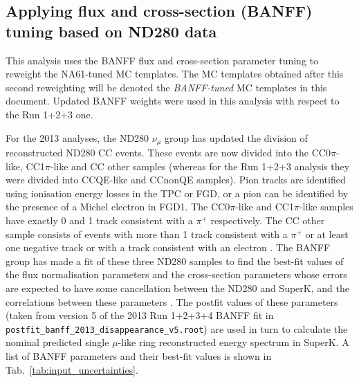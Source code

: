
\subsection {Applying flux and cross-section (BANFF) tuning based on ND280 data}
\label{sec:banff_weights}

This analysis uses the BANFF flux and cross-section parameter tuning to reweight the NA61-tuned MC templates.
The MC templates obtained after this second reweighting will be denoted the {\em BANFF-tuned} MC templates
in this document.
Updated BANFF weights were used in this analysis with respect to the Run 1+2+3 one.

For the 2013 analyses, the ND280 $\nu_{\mu}$ group has updated the division of reconstructed ND280 CC events. 
These events are now divided into the CC0$\pi$-like, CC1$\pi$-like and CC other samples (whereas for the Run 1+2+3 analysis they were divided into CCQE-like 
and CCnonQE samples). Pion tracks are identified using ionisation energy losses in the TPC or FGD, or a pion can be identified
by the presence of a Michel electron in FGD1. The CC0$\pi$-like and CC1$\pi$-like samples have exactly 0 and 1 track consistent with
a $\pi^{+}$ respectively. The CC other sample consists of events with more than 1 track consistent with a $\pi^{+}$ or at least
one negative track or with a track consistent with an electron \cite{ND280Inputs}. The BANFF group has made a fit of these three ND280 
samples to find the best-fit values of the flux normalisation parameters and the cross-section parameters whose errors are expected to 
have some cancellation between the ND280 and SuperK, and the correlations between these parameters \cite{BANFF2013}. The postfit values of these 
parameters (taken from version 5 of the 2013 Run 1+2+3+4 BANFF fit in \verb+postfit_banff_2013_disappearance_v5.root+) are used in
turn to calculate the nominal predicted single $\mu$-like ring reconstructed energy spectrum in SuperK.
A list of BANFF parameters and their best-fit values is shown in Tab.\ \ref{tab:input_uncertainties}.


